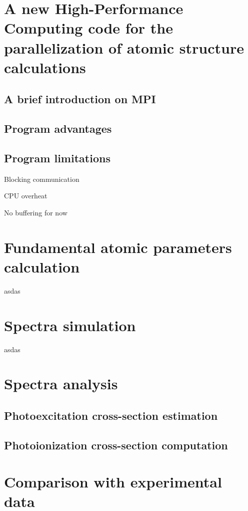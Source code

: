 
%

\chapter{A new High-Performance Computing code for the parallelization of atomic structure calculations}
\section{A brief introduction on \gls{MPI}}


\section{Program advantages}
\section{Program limitations}
Blocking communication

CPU overheat

No buffering for now
\chapter{Fundamental atomic parameters calculation}
asdas
\chapter{Spectra simulation}
asdas

\chapter{Spectra analysis}
\section{Photoexcitation cross-section estimation}
\section{Photoionization cross-section computation}

\chapter{Comparison with experimental data}
